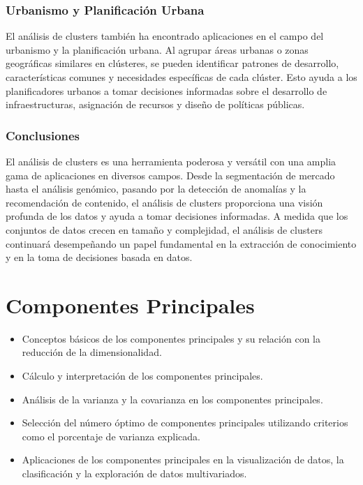 \documentclass{article}
\begin{document}
\subsubsection{Urbanismo y Planificación Urbana}
El análisis de clusters también ha encontrado aplicaciones en el campo del urbanismo y la planificación urbana. Al agrupar áreas urbanas o zonas geográficas similares en clústeres, se pueden identificar patrones de desarrollo, características comunes y necesidades específicas de cada clúster. Esto ayuda a los planificadores urbanos a tomar decisiones informadas sobre el desarrollo de infraestructuras, asignación de recursos y diseño de políticas públicas.

\subsubsection*{Conclusiones}
El análisis de clusters es una herramienta poderosa y versátil con una amplia gama de aplicaciones en diversos campos. Desde la segmentación de mercado hasta el análisis genómico, pasando por la detección de anomalías y la recomendación de contenido, el análisis de clusters proporciona una visión profunda de los datos y ayuda a tomar decisiones informadas. A medida que los conjuntos de datos crecen en tamaño y complejidad, el análisis de clusters continuará desempeñando un papel fundamental en la extracción de conocimiento y en la toma de decisiones basada en datos.
\newpage
\section{Componentes Principales}
\begin{itemize}
\item Conceptos básicos de los componentes principales y su relación con la reducción de la dimensionalidad.
\item Cálculo y interpretación de los componentes principales.
\item Análisis de la varianza y la covarianza en los componentes principales.
\item Selección del número óptimo de componentes principales utilizando criterios como el porcentaje de varianza explicada.
\item Aplicaciones de los componentes principales en la visualización de datos, la clasificación y la exploración de datos multivariados.
\end{itemize}
\end{document}
